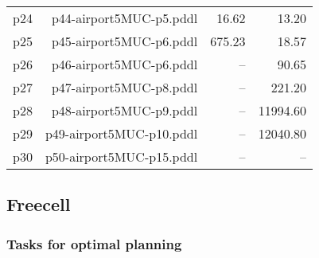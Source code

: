\documentclass{article}
\begin{document}
\begin{center}
\begin{tabular}{@{}l|r|r|r@{}}
  p24& p44-airport5MUC-p5.pddl&16.62&13.20\\
  p25& p45-airport5MUC-p6.pddl&675.23&18.57\\
  p26& p46-airport5MUC-p6.pddl&--&90.65\\
  p27& p47-airport5MUC-p8.pddl&--&221.20\\
  p28& p48-airport5MUC-p9.pddl&--&11994.60\\
  p29& p49-airport5MUC-p10.pddl&--&12040.80\\
  p30& p50-airport5MUC-p15.pddl&--&--
                            \end{tabular}
                            \end{center}
                    
                \newpage \subsection{Freecell}
                    \subsubsection*{Tasks for optimal planning}
                    
\end{document}
